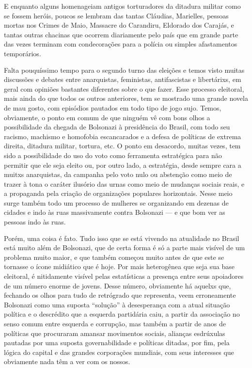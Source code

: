 E enquanto alguns homenageiam antigos torturadores da ditadura militar como se fossem heróis, poucos se lembram das tantas Cláudias, Marielles, pessoas mortas nos Crimes de Maio, Massacre do Carandiru, Eldorado dos Carajás, e tantas outras chacinas que ocorrem diariamente pelo país que em grande parte das vezes terminam com condecorações para a polícia ou simples afastamentos temporários.

Falta pouquíssimo tempo para o segundo turno das eleições e temos visto muitas discussões e debates entre anarquistas, feministas, antifascistas e libertárixs, em geral com opiniões bastantes diferentes sobre o que fazer. Esse processo eleitoral, mais ainda do que todos os outros anteriores, tem se mostrado uma grande novela de mau gosto, com episódios pautados em todo tipo de jogo sujo. Temos, obviamente, o ponto em comum de que ninguém vê com bons olhos a possibilidade da chegada de Bolsonazi à presidência do Brasil, com todo seu racismo, machismo e homofobia escancarados e a defesa de políticas de extrema direita, ditadura militar, tortura, etc.
O ponto em desacordo, muitas vezes, tem sido a possibilidade do uso do voto como ferramenta estratégica para não permitir que ele seja eleito ou, por outro lado, a estratégia, desde sempre cara a muitxs anarquistas, da campanha pelo voto nulo ou abstenção como meio de trazer à tona o caráter ilusório das urnas como meio de mudanças sociais reais, e a propaganda pela criação de organizações populares horizontais. Nesse meio surge também todo um processo de mulheres se organizando em dezenas de cidades e indo às ruas massivamente contra Bolsonazi --- e que bom ver as pessoas indo às ruas.

Porém, uma coisa é fato. Tudo isso que se está vivendo na atualidade no Brasil está muito além de Bolsonazi, que de certa forma é só a parte mais visível de um problema muito maior, e que também começou muito antes de que este se tornasse o ícone midiático que é hoje. Por mais heterogênea que seja sua base eleitoral, é nitidamente visível pelas estatísticas a presença entre seus apoiadores de um número enorme de jovens. Desse número, obviamente há aquelxs que, fechando os olhos para tudo de retrógrado que representa, veem erroneamente Bolsonazi como uma suposta ``solução'' à desesperança com a atual situação política e o descrédito que a esquerda partidária caiu, a partir da associação no senso comum entre esquerda e corrupção, mas também a partir de anos de políticas que procuraram amansar movimentos sociais, alianças esdrúxulas pautadas por uma suposta governabilidade e políticas ditadas, por fim, pela lógica do capital e das grandes corporações mundiais, com seus interesses que obviamente nada têm a ver com os nossos.

